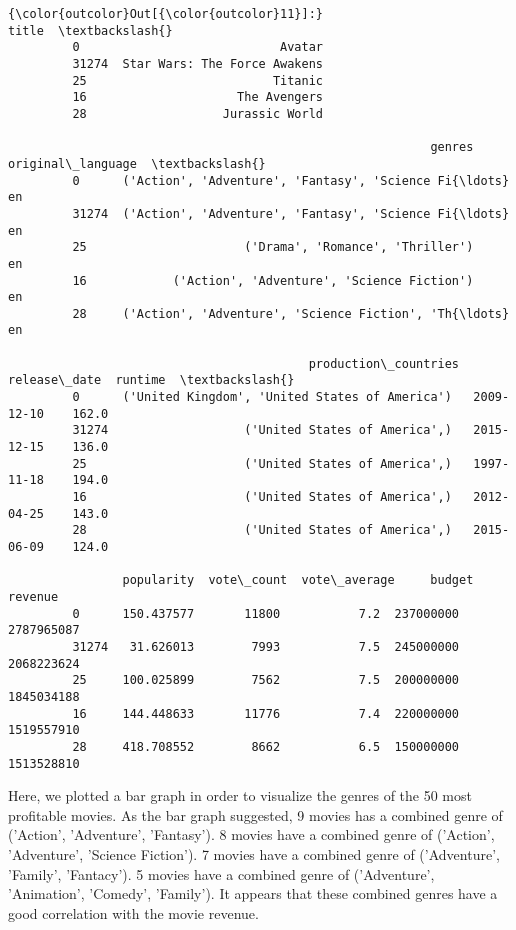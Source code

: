 \documentclass[11pt]{article}
\begin{document}
\begin{Verbatim}[commandchars=\\\{\}]
{\color{outcolor}Out[{\color{outcolor}11}]:}                               title  \textbackslash{}
         0                            Avatar   
         31274  Star Wars: The Force Awakens   
         25                          Titanic   
         16                     The Avengers   
         28                   Jurassic World   
         
                                                           genres original\_language  \textbackslash{}
         0      ('Action', 'Adventure', 'Fantasy', 'Science Fi{\ldots}                en   
         31274  ('Action', 'Adventure', 'Fantasy', 'Science Fi{\ldots}                en   
         25                      ('Drama', 'Romance', 'Thriller')                en   
         16            ('Action', 'Adventure', 'Science Fiction')                en   
         28     ('Action', 'Adventure', 'Science Fiction', 'Th{\ldots}                en   
         
                                          production\_countries release\_date  runtime  \textbackslash{}
         0      ('United Kingdom', 'United States of America')   2009-12-10    162.0   
         31274                   ('United States of America',)   2015-12-15    136.0   
         25                      ('United States of America',)   1997-11-18    194.0   
         16                      ('United States of America',)   2012-04-25    143.0   
         28                      ('United States of America',)   2015-06-09    124.0   
         
                popularity  vote\_count  vote\_average     budget     revenue  
         0      150.437577       11800           7.2  237000000  2787965087  
         31274   31.626013        7993           7.5  245000000  2068223624  
         25     100.025899        7562           7.5  200000000  1845034188  
         16     144.448633       11776           7.4  220000000  1519557910  
         28     418.708552        8662           6.5  150000000  1513528810  
\end{Verbatim}
            
    Here, we plotted a bar graph in order to visualize the genres of the 50
most profitable movies. As the bar graph suggested, 9 movies has a
combined genre of ('Action', 'Adventure', 'Fantasy'). 8 movies have a
combined genre of ('Action', 'Adventure', 'Science Fiction'). 7 movies
have a combined genre of ('Adventure', 'Family', 'Fantacy'). 5 movies
have a combined genre of ('Adventure', 'Animation', 'Comedy', 'Family').
It appears that these combined genres have a good correlation with the
movie revenue.
\end{document}
